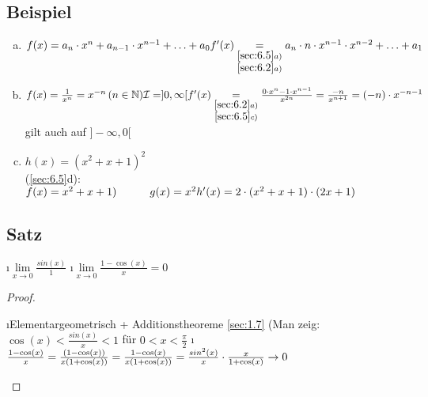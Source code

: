 \subsection{Beispiel}
\begin{enumerate}[a)]
\item $f(x) = a_n \cdot x^n + a_{n-1} \cdot x^{n-1} + \ldots + a_0\\
f'(x) \underset{\substack{\ref{sec:6.5}a)\\
\ref{sec:6.2}a)}}{=} a_n \cdot n \cdot x^{n-1} \cdot x^{n-2} + \ldots + a_1$
\item $f(x) = \frac{1}{x^n} = x^{-n} \, (n \in \mathbb{N})\\
\mathcal{I} = ]0,\infty[\\
f'(x) \underset{\substack{\ref{sec:6.2}a)\\
\ref{sec:6.5}c)}}{=} \frac{0 \cdot x^n - 1 \cdot x^{n-1}}{x^{2n}} = \frac{-n}{x^{n+1}} = (-n) \cdot x^{-n-1}$ gilt auch auf $]-\infty,0[$
\item $h(x) = (x^2 + x + 1)^2$\\
(\ref{sec:6.5}d): $f(x) = x^2 + x + 1)\\
\hspace*{1.05cm}g(x)= x^2\\
h'(x) = 2 \cdot (x^2 + x + 1) \cdot (2x + 1)$
\end{enumerate}
\subsection[Satz:]{Satz}
\begin{enumerate}[a)]
\i $\lim\limits_{x \to 0} \frac{sin(x)}{1}$
\i $\lim\limits_{x \to 0} \frac{1-\cos(x)}{x} = 0$
\end{enumerate}
\begin{proof}\ \\
\begin{enumerate}[a)]
\i Elementargeometrisch + Additionstheoreme \ref{sec:1.7}
(Man zeig: $\cos(x) < \frac{sin(x)}{x} < 1$ für $0 < x < \frac{\pi}{2}$
\i $\frac{1-\cos(x)}{x} = \frac{(1-\cos(x))}{x(1+\cos(x))} = \frac{1-\cos(x)}{x(1 + \cos(x))} = \frac{sin^2(x)}{x} \cdot \frac{x}{1 + \cos(x)} \to 0$
\end{enumerate}
\end{proof}
